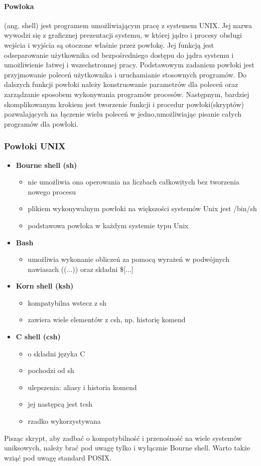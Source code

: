 \documentclass[a4paper,twoside]{report}
\begin{document}
\paragraph{Powłoka} (ang. shell) jest programem umożliwiającym pracę z systemem   UNIX. Jej nazwa wywodzi się z graficznej prezentacji systemu, w której jądro i procesy obsługi wejścia i wyjścia są otoczone właśnie przez powłokę. Jej funkcją jest odseparowanie użytkownika od bezpośredniego dostępu do jądra systemu i umożliwienie   łatwej i wszechstronnej pracy. Podstawowym zadaniem powłoki jest przyjmowanie     poleceń użytkownika i uruchamianie stosownych programów. Do dalszych funkcji powłoki należy konstruowanie parametrów dla poleceń oraz zarządzanie sposobem wykonywania programów procesów. Następnym, bardziej skomplikowanym krokiem jest tworzenie   funkcji i procedur powłoki(skryptów) pozwalających   na łączenie wielu   poleceń  w   jedno,umożliwiając pisanie całych programów dla powłoki.
\subsubsection{Powłoki UNIX}
\begin{itemize}
\item \textbf{Bourne shell (sh)}
	\begin{itemize}
	\item nie umożliwia ona operowania na liczbach całkowitych bez tworzenia nowego procesu
	\item plikiem wykonywalnym powłoki na większości systemów Unix jest /bin/sh
	\item  podstawowa powłoka w każdym systemie typu Unix
	\end{itemize}
\item \textbf{Bash}
	\begin{itemize}
	\item umożliwia wykonanie obliczeń za pomocą wyrażeń w podwójnych nawiasach ((...)) oraz składni \$[...]
	\end{itemize}
\item \textbf{Korn shell (ksh)}
	\begin{itemize}
	\item kompatybilna wstecz z sh
	\item zawiera wiele elementów z csh, np. historię komend
	\end{itemize}
\item \textbf{C shell (csh)}
	\begin{itemize}
	\item o składni języka C
	\item pochodzi od sh
	\item ulepszenia: aliasy i historia komend
	\item jej następcą jest tcsh
	\item rzadko wykorzystywana
	\end{itemize}
\end{itemize}
Pisząc skrypt, aby zadbać o kompatybilność i przenośność na wiele systemów uniksowych, należy brać pod uwagę tylko i wyłącznie Bourne shell. Warto także wziąć pod uwagę standard POSIX.
\end{document}

